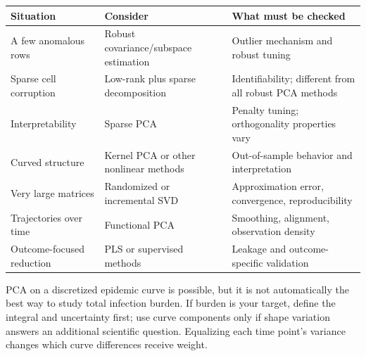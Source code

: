 \documentclass[11pt]{article}
\begin{document}
\begin{center}\begin{tabular}{p{.24\linewidth}p{.33\linewidth}p{.34\linewidth}}\toprule
Situation & Consider & What must be checked\\\midrule
A few anomalous rows & Robust covariance/subspace estimation & Outlier mechanism and robust tuning\\
Sparse cell corruption & Low-rank plus sparse decomposition & Identifiability; different from all robust PCA methods\\
Interpretability & Sparse PCA & Penalty tuning; orthogonality properties vary\\
Curved structure & Kernel PCA or other nonlinear methods & Out-of-sample behavior and interpretation\\
Very large matrices & Randomized or incremental SVD & Approximation error, convergence, reproducibility\\
Trajectories over time & Functional PCA & Smoothing, alignment, observation density\\
Outcome-focused reduction & PLS or supervised methods & Leakage and outcome-specific validation\\\bottomrule
\end{tabular}\end{center}
PCA on a discretized epidemic curve is possible, but it is not automatically the best way to study total infection burden. If burden is your target, define the integral and uncertainty first; use curve components only if shape variation answers an additional scientific question. Equalizing each time point's variance changes which curve differences receive weight.
\end{document}
